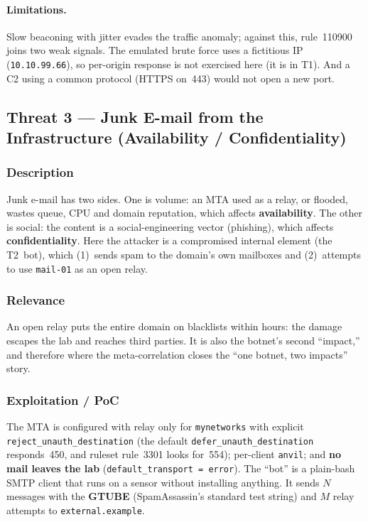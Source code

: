\documentclass[11pt,a4paper]{article}
\begin{document}
\paragraph{Limitations.} Slow beaconing with jitter evades the traffic anomaly; against this,
rule~110900 joins two weak signals. The emulated brute force uses a fictitious IP
(\texttt{10.10.99.66}), so per-origin response is not exercised here (it is in T1). And a C2
using a common protocol (HTTPS on~443) would not open a new port.


\subsection{Threat 3 --- Junk E-mail from the Infrastructure (Availability / Confidentiality)}
\label{sec:t3}

\subsubsection{Description}

Junk e-mail has two sides. One is volume: an MTA used as a relay, or flooded, wastes queue,
CPU and domain reputation, which affects \textbf{availability}. The other is social: the
content is a social-engineering vector (phishing), which affects \textbf{confidentiality}.
Here the attacker is a compromised internal element (the T2~bot), which
(1)~sends spam to the domain's own mailboxes and
(2)~attempts to use \texttt{mail-01} as an open relay.

\subsubsection{Relevance}

An open relay puts the entire domain on blacklists within hours: the damage escapes the lab
and reaches third parties. It is also the botnet's second ``impact,'' and therefore where the
meta-correlation closes the ``one botnet, two impacts'' story.

\subsubsection{Exploitation / PoC}

\begin{sloppypar}
The MTA is configured with relay only for \texttt{mynetworks} with
explicit \texttt{reject\_unauth\_destination} (the default
\texttt{defer\_unauth\_destination} responds~450, and ruleset
rule~3301 looks for~554); per-client \texttt{anvil}; and \textbf{no mail
leaves the lab} (\texttt{default\_transport = error}). The ``bot'' is a
plain-bash SMTP client that runs on a sensor without installing anything.
It sends $N$ messages with the \textbf{GTUBE} (SpamAssassin's standard
test string) and $M$ relay attempts to \texttt{external.example}.
\end{sloppypar}
\end{document}

